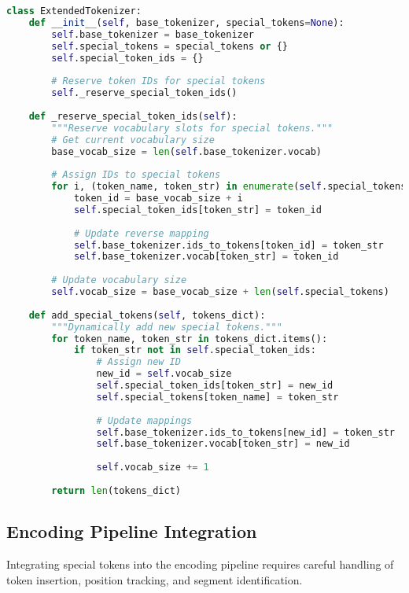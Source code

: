 \begin{lstlisting}[language=Python, caption=Safe vocabulary extension for special tokens]
class ExtendedTokenizer:
    def __init__(self, base_tokenizer, special_tokens=None):
        self.base_tokenizer = base_tokenizer
        self.special_tokens = special_tokens or {}
        self.special_token_ids = {}
        
        # Reserve token IDs for special tokens
        self._reserve_special_token_ids()
        
    def _reserve_special_token_ids(self):
        """Reserve vocabulary slots for special tokens."""
        # Get current vocabulary size
        base_vocab_size = len(self.base_tokenizer.vocab)
        
        # Assign IDs to special tokens
        for i, (token_name, token_str) in enumerate(self.special_tokens.items()):
            token_id = base_vocab_size + i
            self.special_token_ids[token_str] = token_id
            
            # Update reverse mapping
            self.base_tokenizer.ids_to_tokens[token_id] = token_str
            self.base_tokenizer.vocab[token_str] = token_id
            
        # Update vocabulary size
        self.vocab_size = base_vocab_size + len(self.special_tokens)
        
    def add_special_tokens(self, tokens_dict):
        """Dynamically add new special tokens."""
        for token_name, token_str in tokens_dict.items():
            if token_str not in self.special_token_ids:
                # Assign new ID
                new_id = self.vocab_size
                self.special_token_ids[token_str] = new_id
                self.special_tokens[token_name] = token_str
                
                # Update mappings
                self.base_tokenizer.ids_to_tokens[new_id] = token_str
                self.base_tokenizer.vocab[token_str] = new_id
                
                self.vocab_size += 1
                
        return len(tokens_dict)
\end{lstlisting}

\subsection{Encoding Pipeline Integration}

Integrating special tokens into the encoding pipeline requires careful handling of token insertion, position tracking, and segment identification.

